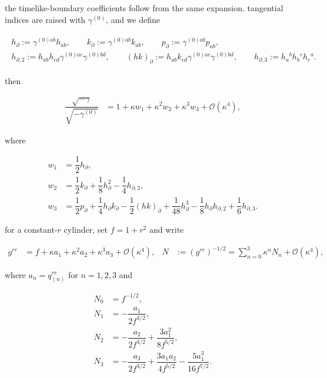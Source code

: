 the timelike-boundary coefficients follow from the same expansion. tangential indices are raised with $\displaystyle{\gamma ^{(0)}}$, and we define

\begin{align}
\begin{gathered}
h_{\partial}:=\gamma ^{(0)ab}h_{ab},\qquad k_{\partial}:=\gamma ^{(0)ab}k_{ab},\qquad p_{\partial}:=\gamma ^{(0)ab}p_{ab}, \\
h_{\partial,2}:=h_{ab}h_{cd}\gamma ^{(0)ac}\gamma ^{(0)bd},\qquad (hk)_{\partial}:=h_{ab}k_{cd}\gamma ^{(0)ac}\gamma ^{(0)bd},\qquad h_{\partial,3}:=h_{a}{}^{b}h_{b}{}^{c}h_{c}{}^{a}.
\end{gathered}
\end{align}

then

\begin{align}
\dfrac{\sqrt{-\gamma}}{\sqrt{-\gamma ^{(0)}}} & =1+\kappa w_{1}+\kappa ^2w_{2}+\kappa ^3w_{3}+\mathcal{O}(\kappa ^4),
\end{align}

where

\[\begin{aligned}
w_{1} & =\dfrac{1}{2}h_{\partial}, \\
w_{2} & =\dfrac{1}{2}k_{\partial}+\dfrac{1}{8}h_{\partial}^{2}-\dfrac{1}{4}h_{\partial,2}, \\
w_{3} & =\dfrac{1}{2}p_{\partial}+\dfrac{1}{4}h_{\partial}k_{\partial}-\dfrac{1}{2}(hk)_{\partial}+\dfrac{1}{48}h_{\partial}^{3}-\dfrac{1}{8}h_{\partial}h_{\partial,2}+\dfrac{1}{6}h_{\partial,3}.
\end{aligned}\]

for a constant-$\displaystyle{r}$ cylinder, set $\displaystyle{f=1+r^{2}}$ and write

\begin{align}
g^{rr} & =f+\kappa a_{1}+\kappa ^2a_{2}+\kappa ^3a_{3}+\mathcal{O}(\kappa ^4), & N&:=(g^{rr})^{-1/2}=\sum _{n=0}^{3}\kappa ^nN_{n}+\mathcal{O}(\kappa ^4),
\end{align}

where $\displaystyle{a_{n}=q_{(n)}^{rr}}$ for $\displaystyle{n=1,2,3}$ and

\[\begin{aligned}
N_{0} & =f^{-1/2}, \\
N_{1} & =-\dfrac{a_{1}}{2f^{3/2}}, \\
N_{2} & =-\dfrac{a_{2}}{2f^{3/2}}+\dfrac{3a_{1}^{2}}{8f^{5/2}}, \\
N_{3} & =-\dfrac{a_{3}}{2f^{3/2}}+\dfrac{3a_{1}a_{2}}{4f^{5/2}}-\dfrac{5a_{1}^{3}}{16f^{7/2}}.
\end{aligned}\]

